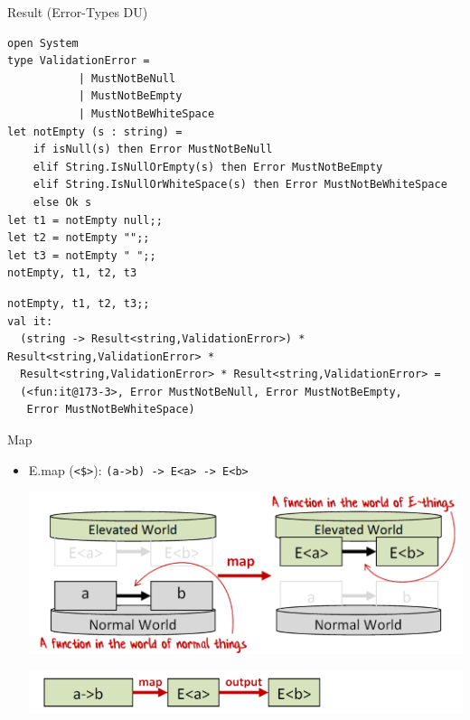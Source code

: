 \documentclass[t]{beamer}
\begin{document}
\begin{frame}[label={sec:orga608ed4},fragile]{Result (Error-Types DU)}
 \begin{verbatim}
open System
type ValidationError =
           | MustNotBeNull
           | MustNotBeEmpty
           | MustNotBeWhiteSpace
let notEmpty (s : string) =
    if isNull(s) then Error MustNotBeNull
    elif String.IsNullOrEmpty(s) then Error MustNotBeEmpty
    elif String.IsNullOrWhiteSpace(s) then Error MustNotBeWhiteSpace
    else Ok s
let t1 = notEmpty null;;
let t2 = notEmpty "";;
let t3 = notEmpty " ";;
notEmpty, t1, t2, t3
\end{verbatim}

\begin{verbatim}
notEmpty, t1, t2, t3;;
val it:
  (string -> Result<string,ValidationError>) * Result<string,ValidationError> *
  Result<string,ValidationError> * Result<string,ValidationError> =
  (<fun:it@173-3>, Error MustNotBeNull, Error MustNotBeEmpty,
   Error MustNotBeWhiteSpace)
\end{verbatim}
\end{frame}

\begin{frame}[label={sec:orgd141e88},fragile]{Map}
 \begin{itemize}
\item E.map (\texttt{<\$>}): \texttt{(a->b) -> E<a> -> E<b>}
\begin{center}
\includegraphics[width=.9\linewidth]{./../img/vgfp_map.png}
\end{center}
\begin{center}
\includegraphics[width=.9\linewidth]{./../img/vgfp_map2.png}
\end{center}
\end{itemize}
\end{frame}
\end{document}
